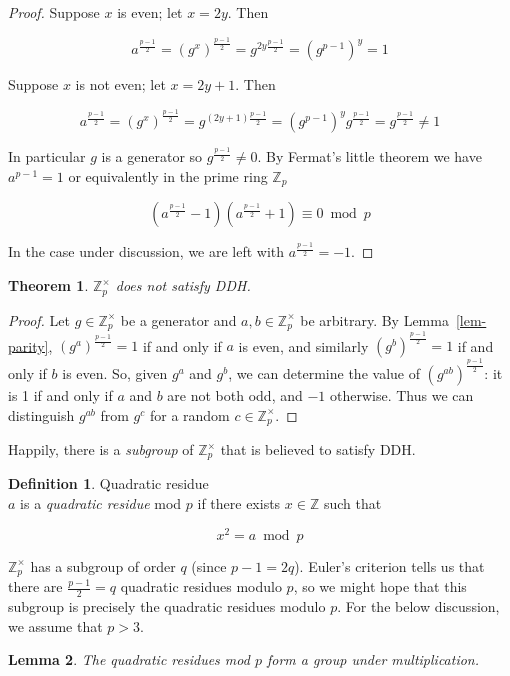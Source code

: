 \documentclass[11pt,twoside,a4paper]{article}
\newtheorem{theorem}{Theorem}[section]
\newtheorem{lemma}[theorem]{Lemma}
\theoremstyle{definition}
\newtheorem{definition}{Definition}[section]
\begin{document}
\begin{proof}
    Suppose \(x\) is even; let \(x=2y\). Then

    \[a^{\frac{p-1}{2}}=(g^x)^{\frac{p-1}{2}}=g^{2y\frac{p-1}{2}}=(g^{p-1})^y=1\]

    Suppose \(x\) is not even; let \(x=2y+1\). Then

    \[a^{\frac{p-1}{2}}=(g^x)^{\frac{p-1}{2}}=g^{(2y+1)\frac{p-1}{2}}=(g^{p-1})^yg^{\frac{p-1}{2}}=g^{\frac{p-1}{2}}\neq 1\]

    In particular \(g\) is a generator so \(g^\frac{p-1}{2}\neq 0\). By Fermat's little theorem we have \(a^{p-1}=1\) or equivalently in the prime ring \(\mathbb{Z}_p\)

    \[\left(a^\frac{p-1}{2}-1\right)\left(a^\frac{p-1}{2}+1\right)\equiv 0\bmod p\]
    
    In the case under discussion, we are left with \(a^\frac{p-1}{2}=-1\).
\end{proof}
\begin{theorem}
    \(\mathbb{Z}^\times_p\) does not satisfy DDH.
\end{theorem}
\begin{proof}
    Let \(g\in\mathbb{Z}^\times_p\) be a generator and \(a,b\in\mathbb{Z}^\times_p\) be arbitrary. By Lemma~\ref{lem-parity}, \((g^a)^{\frac{p-1}{2}}=1\) if and only if \(a\) is even, and similarly \((g^b)^{\frac{p-1}{2}}=1\) if and only if \(b\) is even. So, given \(g^a\) and \(g^b\), we can determine the value of \(\left(g^{ab}\right)^\frac{p-1}{2}\): it is 1 if and only if \(a\) and \(b\) are not both odd, and \(-1\) otherwise. Thus we can distinguish \(g^{ab}\) from \(g^c\) for a random \(c\in\mathbb{Z}^\times_p\).
\end{proof}
Happily, there is a \textit{subgroup} of \(\mathbb{Z}^\times_p\) that is believed to satisfy DDH.
\begin{definition}{Quadratic residue}\\
    \(a\) is a \textit{quadratic residue} mod \(p\) if there exists \(x\in\mathbb{Z}\) such that

    \[x^2=a\bmod p\]

\end{definition}
\(\mathbb{Z}^\times_p\) has a subgroup of order \(q\) (since \(p-1=2q\)). Euler's criterion tells us that there are \(\frac{p-1}{2}=q\) quadratic residues modulo \(p\), so we might hope that this subgroup is precisely the quadratic residues modulo \(p\). For the below discussion, we assume that \(p>3\).
\begin{lemma}
    The quadratic residues mod \(p\) form a group under multiplication.
\end{lemma}
\end{document}
